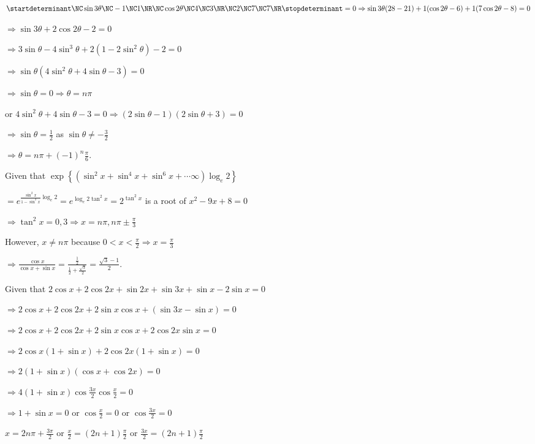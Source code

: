   $\startdeterminant\NC \sin3\theta\NC -1\NC 1\NR\NC \cos2\theta\NC 4\NC 3\NR\NC 2\NC 7\NC
  7\NR\stopdeterminant = 0 \Rightarrow \sin3\theta(28 - 21) + 1(\cos2\theta - 6) + 1(7\cos2\theta - 8) = 0$

  $\Rightarrow \sin3\theta + 2\cos2\theta - 2 = 0$

  $\Rightarrow 3\sin\theta - 4\sin^3\theta + 2\left(1 - 2\sin^2\theta\right) - 2 = 0$

  $\Rightarrow \sin\theta\left(4\sin^2\theta + 4\sin\theta - 3\right) = 0$

  $\Rightarrow \sin\theta = 0 \Rightarrow \theta = n\pi$

  or $4\sin^2\theta + 4\sin\theta - 3 = 0 \Rightarrow (2\sin\theta - 1)(2\sin\theta + 3) = 0$

  $\Rightarrow \sin\theta = \frac{1}{2}$ as $\sin\theta \ne-\frac{3}{2}$

  $\Rightarrow \theta = n\pi + (-1)^n\frac{\pi}{6}$.
\item Given that $\exp\left\{\left(\sin^2x + \sin^4x + \sin^6x + \cdots \infty\right)\log_e2\right\}$

  $= e^{\frac{\sin^2x}{1 - \sin^2x}\log_e2} = e^{\log_e2\tan^2x} = 2^{\tan^2x}$ is a root of $x^2 - 9x + 8 =
  0$

  $\Rightarrow \tan^2x = 0, 3\Rightarrow x = n\pi, n\pi\pm\frac{\pi}{3}$

  However, $x\ne n\pi$ because $0 < x <\frac{\pi}{2}\Rightarrow x = \frac{\pi}{3}$

  $\Rightarrow \frac{\cos x}{\cos x + \sin x} = \frac{\frac{1}{2}}{\frac{1}{2} + \frac{\sqrt{3}}{2}}
  = \frac{\sqrt{3} - 1}{2}$.
\item Given that $2\cos x + 2\cos2x + \sin2x + \sin3x + \sin x - 2\sin x = 0$

  $\Rightarrow 2\cos x + 2\cos2x + 2\sin x\cos x + (\sin3x - \sin x) = 0$

  $\Rightarrow 2\cos x + 2\cos2x + 2\sin x\cos x + 2\cos2x\sin x = 0$

  $\Rightarrow 2\cos x(1 + \sin x) + 2\cos2x(1 + \sin x) = 0$

  $\Rightarrow 2(1 + \sin x)(\cos x + \cos 2x) = 0$

  $\Rightarrow 4(1 + \sin x)\cos\frac{3x}{2}\cos\frac{x}{2} = 0$

  $\Rightarrow 1 + \sin x = 0$ or $\cos\frac{x}{2} = 0$ or $\cos\frac{3x}{2} = 0$

  $x = 2n\pi + \frac{3\pi}{2}$ or $\frac{x}{2} = (2n + 1)\frac{\pi}{2}$ or $\frac{3x}{2} = (2n +
  1)\frac{\pi}{2}$

